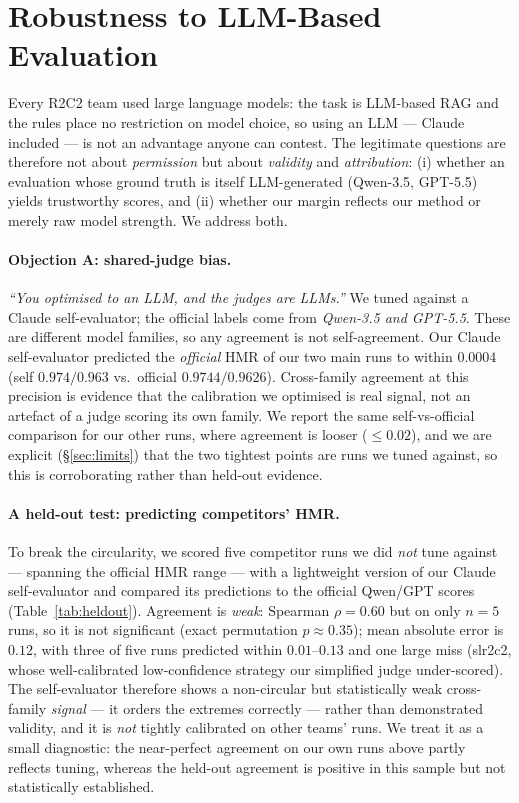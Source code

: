 \documentclass[sigconf,nonacm]{acmart}
\newcommand{\HMR}{\textsc{HMR}}
\begin{document}
\section{Robustness to LLM-Based Evaluation}
\label{sec:judge}
Every R2C2 team used large language models: the task is LLM-based RAG and the rules place
no restriction on model choice, so using an LLM --- Claude included --- is not an advantage
anyone can contest. The legitimate questions are therefore not about \emph{permission} but
about \emph{validity} and \emph{attribution}: (i) whether an evaluation whose ground truth
is itself LLM-generated (Qwen-3.5, GPT-5.5) yields trustworthy scores, and (ii) whether our
margin reflects our method or merely raw model strength. We address both.

\paragraph{Objection A: shared-judge bias.} \emph{``You optimised to an LLM, and the judges
are LLMs.''} We tuned against a Claude self-evaluator; the official labels come from
\emph{Qwen-3.5 and GPT-5.5}. These are different model families, so any agreement is not
self-agreement. Our Claude self-evaluator predicted the \emph{official} \HMR{} of our two
main runs to within $\mathbf{0.0004}$ (self $0.974/0.963$ vs.\ official $0.9744/0.9626$).
Cross-family agreement at this precision is evidence that the calibration we optimised is
real signal, not an artefact of a judge scoring its own family. We report the same
self-vs-official comparison for our other runs, where agreement is looser
($\le 0.02$), and we are explicit (\S\ref{sec:limits}) that the two tightest points are
runs we tuned against, so this is corroborating rather than held-out evidence.

\paragraph{A held-out test: predicting competitors' \HMR.} To break the circularity, we
scored five competitor runs we did \emph{not} tune against --- spanning the official \HMR{}
range --- with a lightweight version of our Claude self-evaluator and compared its
predictions to the official Qwen/GPT scores (Table~\ref{tab:heldout}). Agreement is
\emph{weak}: Spearman $\rho{=}0.60$ but on only $n{=}5$ runs, so it is not significant
(exact permutation $p{\approx}0.35$); mean absolute error is $0.12$, with three of five runs
predicted within $0.01$--$0.13$ and one large miss (slr2c2, whose well-calibrated
low-confidence strategy our simplified judge under-scored). The self-evaluator therefore
shows a non-circular but statistically weak cross-family \emph{signal} --- it orders the
extremes correctly --- rather than demonstrated validity, and it is \emph{not} tightly
calibrated on other teams' runs. We treat it as a small diagnostic: the near-perfect
agreement on our own runs above partly reflects tuning, whereas the held-out agreement is
positive in this sample but not statistically established.
\end{document}
